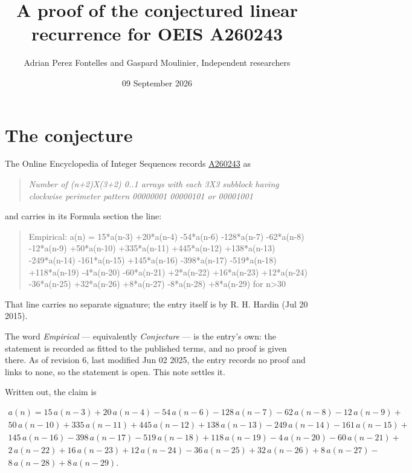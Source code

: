 \documentclass[11pt]{article}
\title{A proof of the conjectured linear recurrence for OEIS A260243}
\author{Adrian Perez Fontelles and Gaspard Moulinier, Independent researchers}
\date{09 September 2026}
\theoremstyle{definition}
\begin{document}
\maketitle
\section{The conjecture}

The Online Encyclopedia of Integer Sequences records \href{https://oeis.org/A260243}{A260243} as

\begin{quote}\itshape Number of (n+2)X(3+2) 0..1 arrays with each 3X3 subblock having clockwise perimeter pattern 00000001 00000101 or 00001001\end{quote}

and carries in its Formula section the line:

\begin{quote}\ttfamily Empirical: a(n) = 15*a(n-3) +20*a(n-4) -54*a(n-6) -128*a(n-7) -62*a(n-8) -12*a(n-9) +50*a(n-10) +335*a(n-11) +445*a(n-12) +138*a(n-13) -249*a(n-14) -161*a(n-15) +145*a(n-16) -398*a(n-17) -519*a(n-18) +118*a(n-19) -4*a(n-20) -60*a(n-21) +2*a(n-22) +16*a(n-23) +12*a(n-24) -36*a(n-25) +32*a(n-26) +8*a(n-27) -8*a(n-28) +8*a(n-29) for n>30\end{quote}

That line carries no separate signature; the entry itself is by R. H. Hardin (Jul 20 2015).

The word {\itshape Empirical} --- equivalently {\itshape Conjecture} --- is the entry's own: the statement is recorded as fitted to the published terms, and no proof is given there. As of revision 6, last modified Jun 02 2025, the entry records no proof and links to none, so the statement is open. This note settles it.

Written out, the claim is

\begin{multline*} a(n) = 15\,a(n-3) + 20\,a(n-4) - 54\,a(n-6) - 128\,a(n-7) - 62\,a(n-8) - 12\,a(n-9) + \\ 50\,a(n-10) + 335\,a(n-11) + 445\,a(n-12) + 138\,a(n-13) - 249\,a(n-14) - 161\,a(n-15) + \\ 145\,a(n-16) - 398\,a(n-17) - 519\,a(n-18) + 118\,a(n-19) - 4\,a(n-20) - 60\,a(n-21) + \\ 2\,a(n-22) + 16\,a(n-23) + 12\,a(n-24) - 36\,a(n-25) + 32\,a(n-26) + 8\,a(n-27) - \\ 8\,a(n-28) + 8\,a(n-29). \end{multline*}
\end{document}
